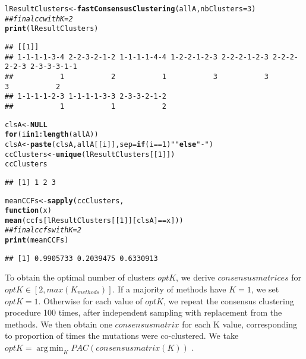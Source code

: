 \documentclass{article}\usepackage[]{graphicx}\usepackage[]{color}
\makeatletter
\newcommand{\hlnum}[1]{\textcolor[rgb]{0.686,0.059,0.569}{#1}}%
\newcommand{\hlstr}[1]{\textcolor[rgb]{0.192,0.494,0.8}{#1}}%
\newcommand{\hlcom}[1]{\textcolor[rgb]{0.678,0.584,0.686}{\textit{#1}}}%
\newcommand{\hlopt}[1]{\textcolor[rgb]{0,0,0}{#1}}%
\newcommand{\hlstd}[1]{\textcolor[rgb]{0.345,0.345,0.345}{#1}}%
\newcommand{\hlkwa}[1]{\textcolor[rgb]{0.161,0.373,0.58}{\textbf{#1}}}%
\newcommand{\hlkwb}[1]{\textcolor[rgb]{0.69,0.353,0.396}{#1}}%
\newcommand{\hlkwc}[1]{\textcolor[rgb]{0.333,0.667,0.333}{#1}}%
\newcommand{\hlkwd}[1]{\textcolor[rgb]{0.737,0.353,0.396}{\textbf{#1}}}%
\newenvironment{kframe}{%
 \def\at@end@of@kframe{}%
 \ifinner\ifhmode%
  \def\at@end@of@kframe{\end{minipage}}%
  \begin{minipage}{\columnwidth}%
 \fi\fi%
 \def\FrameCommand##1{\hskip\@totalleftmargin \hskip-\fboxsep
 \colorbox{shadecolor}{##1}\hskip-\fboxsep
     \hskip-\linewidth \hskip-\@totalleftmargin \hskip\columnwidth}%
 \MakeFramed {\advance\hsize-\width
   \@totalleftmargin\z@ \linewidth\hsize
   \@setminipage}}%
 {\par\unskip\endMakeFramed%
 \at@end@of@kframe}
\newenvironment{knitrout}{}{} %
\makeatother
\begin{document}
\begin{knitrout}\scriptsize
{}\color{fgcolor}\begin{kframe}
\begin{alltt}
\hlstd{lResultClusters} \hlkwb{<-} \hlkwd{fastConsensusClustering}\hlstd{(allA,}\hlkwc{nbClusters}\hlstd{=}\hlnum{3}\hlstd{)}
\hlcom{## final cc with K=2}
\hlkwd{print}\hlstd{(lResultClusters)}
\end{alltt}
\begin{verbatim}
## [[1]]
## 1-1-1-1-3-4 2-2-3-2-1-2 1-1-1-1-4-4 1-2-2-1-2-3 2-2-2-1-2-3 2-2-2-2-2-3 2-3-3-3-1-1 
##           1           2           1           3           3           3           2 
## 1-1-1-1-2-3 1-1-1-1-3-3 2-3-3-2-1-2 
##           1           1           2
\end{verbatim}
\begin{alltt}
\hlstd{clsA} \hlkwb{<-} \hlkwa{NULL}
\hlkwa{for}\hlstd{(i} \hlkwa{in} \hlnum{1}\hlopt{:}\hlkwd{length}\hlstd{(allA))}
    \hlstd{clsA} \hlkwb{<-} \hlkwd{paste}\hlstd{(clsA,allA[[i]],}\hlkwc{sep}\hlstd{=}\hlkwa{if}\hlstd{(i}\hlopt{==}\hlnum{1}\hlstd{)} \hlstr{""} \hlkwa{else} \hlstr{"-"}\hlstd{)}
\hlstd{ccClusters} \hlkwb{<-} \hlkwd{unique}\hlstd{(lResultClusters[[}\hlnum{1}\hlstd{]])}
\hlstd{ccClusters}
\end{alltt}
\begin{verbatim}
## [1] 1 2 3
\end{verbatim}
\begin{alltt}
\hlstd{meanCCFs} \hlkwb{<-} \hlkwd{sapply}\hlstd{(ccClusters,}
                  \hlkwa{function}\hlstd{(}\hlkwc{x}\hlstd{)}
                      \hlkwd{mean}\hlstd{(ccfs[lResultClusters[[}\hlnum{1}\hlstd{]][clsA]}\hlopt{==}\hlstd{x]))}
\hlcom{## final ccfs with K=2}
\hlkwd{print}\hlstd{(meanCCFs)}
\end{alltt}
\begin{verbatim}
## [1] 0.9905733 0.2039475 0.6330913
\end{verbatim}
\end{kframe}
\end{knitrout}

To obtain the optimal number of clusters \(optK\), we derive \(consensus matrices\) for
\(optK\in[2,max(K_{methods})]\). If a majority of methods have \(K=1\), we
set \(optK=1\). Otherwise for each value of \(optK\), we repeat the consensus
clustering procedure 100 times, after independent sampling with
replacement from the methods. We then obtain one \(consensus matrix\) for
each K value, corresponding to proportion of times the mutations were
co-clustered. We take \(optK=\operatorname{arg\,min}_K PAC(consensus matrix(K))\) \cite{senbabaoglu_critical_2014}.\\
\end{document}
